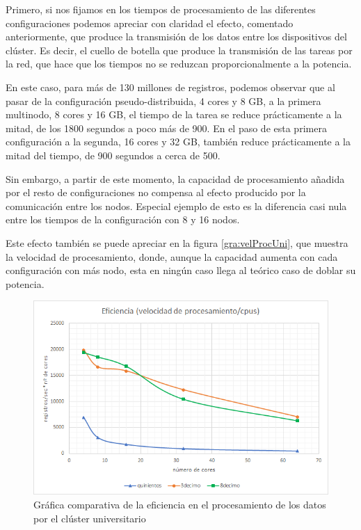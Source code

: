Primero, si nos fijamos en los tiempos de procesamiento de las diferentes configuraciones podemos apreciar con claridad el efecto, comentado anteriormente, que produce la transmisión de los datos entre los dispositivos del clúster. Es decir, el cuello de botella que produce la transmisión de las tareas por la red, que hace que los tiempos no se reduzcan proporcionalmente a la potencia.

En este caso, para más de 130 millones de registros, podemos observar que al pasar de la configuración pseudo-distribuida, 4 cores y 8 \gls{GB}, a la primera multinodo, 8 cores y 16 \gls{GB}, el tiempo de la tarea se reduce prácticamente a la mitad, de los 1800 segundos a poco más de 900. En el paso de esta primera configuración a la segunda, 16 cores y 32 GB, también reduce prácticamente a la mitad del tiempo, de 900 segundos a cerca de 500.

Sin embargo, a partir de este momento, la capacidad de procesamiento añadida por el resto de configuraciones no compensa al efecto producido por la comunicación entre los nodos. Especial ejemplo de esto es la diferencia casi nula entre los tiempos de la configuración con 8 y 16 nodos.

Este efecto también se puede apreciar en la figura \ref{gra:velProcUni}, que muestra la velocidad de procesamiento, donde, aunque la capacidad aumenta con cada configuración con más nodo, esta en ningún caso llega al teórico caso de doblar su potencia. 

\begin{figure}[htp!]
	\centering
	\caption{Gráfica comparativa de la eficiencia en el procesamiento de los datos por el clúster universitario}
	\label{gra:efiProcUni}
	\vspace{5pt}
	\includegraphics[scale=0.85]{graficas/epuni2}
\end{figure}


